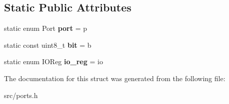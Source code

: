 \subsection*{Static Public Attributes}
\begin{DoxyCompactItemize}
\item 
static enum Port {\bfseries port} = p\hypertarget{structALIBVR__NAMESPACE__PREFIXports_1_1__Io_a6cafc860d7efd0b257b62972d5381a95}{}\label{structALIBVR__NAMESPACE__PREFIXports_1_1__Io_a6cafc860d7efd0b257b62972d5381a95}

\item 
static const uint8\+\_\+t {\bfseries bit} = b\hypertarget{structALIBVR__NAMESPACE__PREFIXports_1_1__Io_acdad55e70a27383942d08d97e67fd68a}{}\label{structALIBVR__NAMESPACE__PREFIXports_1_1__Io_acdad55e70a27383942d08d97e67fd68a}

\item 
static enum I\+O\+Reg {\bfseries io\+\_\+reg} = io\hypertarget{structALIBVR__NAMESPACE__PREFIXports_1_1__Io_a9e24948b8eda58a3ee4b0c23bf21574e}{}\label{structALIBVR__NAMESPACE__PREFIXports_1_1__Io_a9e24948b8eda58a3ee4b0c23bf21574e}

\end{DoxyCompactItemize}


The documentation for this struct was generated from the following file\+:\begin{DoxyCompactItemize}
\item 
src/ports.\+h\end{DoxyCompactItemize}
